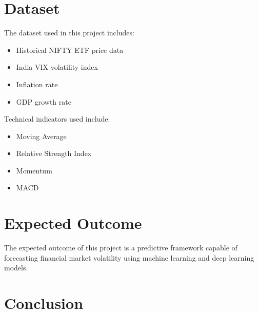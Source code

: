 \documentclass[12pt]{article}
\begin{document}

\newpage
\section{Dataset}

The dataset used in this project includes:

\begin{itemize}

\item Historical NIFTY ETF price data

\item India VIX volatility index

\item Inflation rate

\item GDP growth rate

\end{itemize}

Technical indicators used include:

\begin{itemize}

\item Moving Average

\item Relative Strength Index

\item Momentum

\item MACD

\end{itemize}


\newpage
\section{Expected Outcome}

The expected outcome of this project is a predictive framework capable of forecasting financial market volatility using machine learning and deep learning models.


\newpage
\section{Conclusion}
\end{document}
